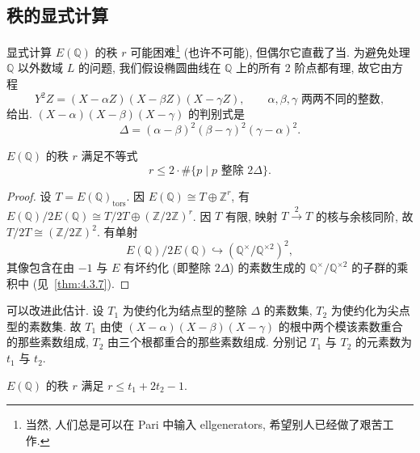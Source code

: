 \subsection*{秩的显式计算}

显式计算 $E(\mathbb{Q})$ 的秩 $r$ 可能困难\footnote{当然, 人们总是可以在 Pari 中输入 ellgenerators, 希望别人已经做了艰苦工作.} (也许不可能), 但偶尔它直截了当. 为避免处理 $\mathbb{Q}$ 以外数域 $L$ 的问题, 我们假设椭圆曲线在 $\mathbb{Q}$ 上的所有 2 阶点都有理, 故它由方程
\[
Y^2Z = (X-\alpha Z)(X-\beta Z)(X-\gamma Z), \qquad \alpha, \beta, \gamma \text{ 两两不同的整数},
\]
给出. $(X-\alpha)(X-\beta)(X-\gamma)$ 的判别式是
\[
\Delta = (\alpha-\beta)^2(\beta-\gamma)^2(\gamma-\alpha)^2.
\]

\begin{proposition} \label{thm:4.5.5} 
$E(\mathbb{Q})$ 的秩 $r$ 满足不等式
\[
r\le 2\cdot\#\{p \mid p \text{ 整除 } 2\Delta\}.
\]
\end{proposition}

\begin{proof}
设 $T = E(\mathbb{Q})_{\mathrm{tors}}$. 因 $E(\mathbb{Q})\cong T\oplus\mathbb{Z}^r$, 有 $E(\mathbb{Q})/2E(\mathbb{Q})\cong T/2T\oplus(\mathbb{Z}/2\mathbb{Z})^r$. 因 $T$ 有限, 映射 $T\xrightarrow{2}T$ 的核与余核同阶, 故 $T/2T\cong(\mathbb{Z}/2\mathbb{Z})^2$. 有单射
\[
E(\mathbb{Q})/2E(\mathbb{Q})\hookrightarrow(\mathbb{Q}^{\times}/\mathbb{Q}^{\times2})^2,
\]
其像包含在由 $-1$ 与 $E$ 有坏约化 (即整除 $2\Delta$) 的素数生成的 $\mathbb{Q}^{\times}/\mathbb{Q}^{\times2}$ 的子群的乘积中 (见~\ref{thm:4.3.7}).
\end{proof}

可以改进此估计. 设 $T_1$ 为使约化为结点型的整除 $\Delta$ 的素数集, $T_2$ 为使约化为尖点型的素数集. 故 $T_1$ 由使 $(X-\alpha)(X-\beta)(X-\gamma)$ 的根中两个模该素数重合的那些素数组成, $T_2$ 由三个根都重合的那些素数组成. 分别记 $T_1$ 与 $T_2$ 的元素数为 $t_1$ 与 $t_2$.

\begin{proposition} \label{thm:4.5.6} 
$E(\mathbb{Q})$ 的秩 $r$ 满足 $r\le t_1 + 2t_2 - 1$.
\end{proposition}

